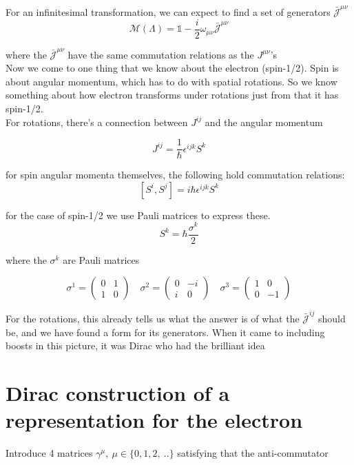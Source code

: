\documentclass[11pt]{article}
\begin{document}
	For an infinitesimal transformation, we can expect to find a set of generators $\bar{\mathcal{J}}^{\mu\nu}$ \[ \mathcal{M}(\Lambda) = \mathbb{1} - \frac{i}{2} \omega_{\mu\nu} \bar{\mathcal{J}}^{\mu\nu} \] 

	where the $\bar{\mathcal{J}}^{\mu\nu}$ have the same commutation relations as the $J^{\mu\nu}$'s\\

	Now we come to one thing that we know about the electron (spin-1/2). Spin is about angular momentum, which has to do with spatial rotations. So we know something about how electron transforms under rotations just from that it has spin-1/2.\\

	For rotations, there's a connection between $J^{ij}$ and the angular momentum
	
	\[ J^{ij} = \frac{1}{\hbar}\epsilon^{ijk} S^{k}\]

for spin angular momenta themselves, the following hold commutation relations: \[ [S^i, S^j] = i \hbar \epsilon^{ijk} S^k\]

	for the case of spin-1/2 we use Pauli matrices to express these. \[ S^k = \hbar \frac{\sigma^k}{2}\]
	
	where the $\sigma^k$ are Pauli matrices
	
	\[ \sigma^1 = \begin{pmatrix}
		0 & 1 \\ 1 & 0
	\end{pmatrix} \quad \sigma^2 = \begin{pmatrix}
	0 & -i \\ i & 0
\end{pmatrix} \quad \sigma^3 = \begin{pmatrix}
1 & 0 \\ 0 & -1
\end{pmatrix}\]

For the rotations, this already tells us what the answer is of what the $\bar{\mathcal{J}}^{ij}$ should be, and we have found a form for its generators. When it came to including boosts in this picture, it was Dirac who had the brilliant idea

\section*{Dirac construction of a representation for the electron}

Introduce 4 matrices $\gamma^\mu,\ \mu \in \{0, 1, 2,\ ..\}$ satisfying that the anti-commutator
\end{document}
